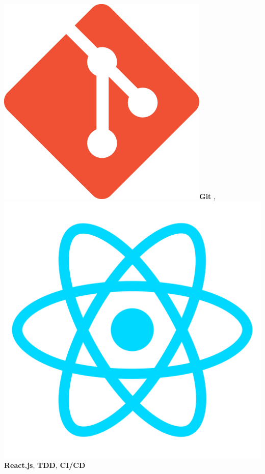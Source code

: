 \documentclass[a4paper]{./classes/friggeri-cv}
\begin{document}
\begin{aside}
{        \includegraphics[scale=0.025]{../assets/images/logos/Git_logo.png}\textbf{Git} ,
        \includegraphics[scale=0.017]{../assets/images/logos/Reactjs_logo.png}\textbf{React.js},
        \textbf{TDD},
        \textbf{CI/CD}
        }
        ~

\end{aside}
\end{document}
